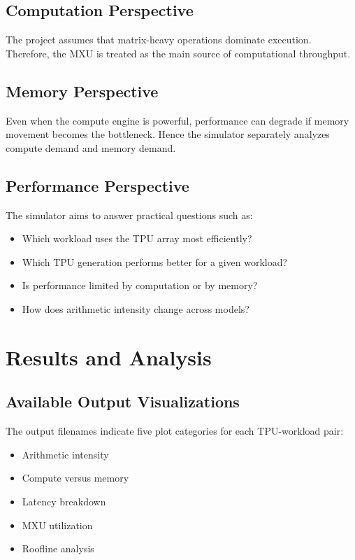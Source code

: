\documentclass[12pt,a4paper]{article}
\begin{document}
	\subsection{Computation Perspective}
	The project assumes that matrix-heavy operations dominate execution. Therefore, the MXU is treated as the main source of computational throughput.
	
	\subsection{Memory Perspective}
	Even when the compute engine is powerful, performance can degrade if memory movement becomes the bottleneck. Hence the simulator separately analyzes compute demand and memory demand.
	
	\subsection{Performance Perspective}
	The simulator aims to answer practical questions such as:
	\begin{itemize}[itemsep=2pt, topsep=4pt]
		\item Which workload uses the TPU array most efficiently?
		\item Which TPU generation performs better for a given workload?
		\item Is performance limited by computation or by memory?
		\item How does arithmetic intensity change across models?
	\end{itemize}
	
	\section{Results and Analysis}
	
	\subsection{Available Output Visualizations}
	The output filenames indicate five plot categories for each TPU-workload pair:
	\begin{itemize}[itemsep=2pt, topsep=4pt]
		\item Arithmetic intensity
		\item Compute versus memory
		\item Latency breakdown
		\item MXU utilization
		\item Roofline analysis
	\end{itemize}
	
\end{document}
